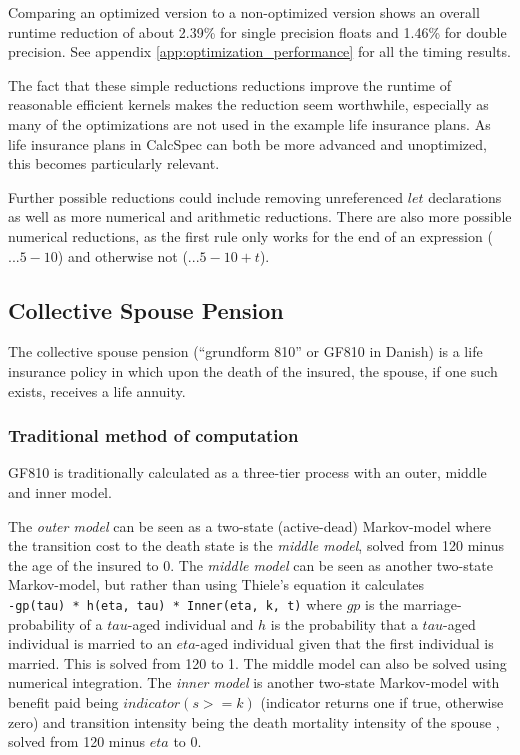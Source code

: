 Comparing an optimized version to a non-optimized version shows an overall runtime reduction of about 2.39\% for single precision floats and 1.46\% for double precision.
See appendix \ref{app:optimization_performance} for all the timing results.

The fact that these simple reductions reductions improve the runtime of reasonable efficient kernels makes the reduction seem worthwhile, especially as many of the optimizations are not used in the example life insurance plans.
As life insurance plans in CalcSpec can both be more advanced and unoptimized, this becomes particularly relevant.

Further possible reductions could include removing unreferenced $let$ declarations as well as more numerical and arithmetic reductions.
There are also more possible numerical reductions, as the first rule only works for the end of an expression ($... 5 - 10$) and otherwise not ($... 5 - 10 + t$).

\subsection{Collective Spouse Pension}\label{sub:gf810}
The collective spouse pension (``grundform 810'' or GF810 in Danish) is a life insurance policy in which upon the death of the insured, the spouse, if one such exists, receives a life annuity.

\subsubsection{Traditional method of computation}
GF810 is traditionally calculated as a three-tier process with an outer, middle and inner model.

The \emph{outer model} can be seen as a two-state (active-dead) Markov-model where the transition cost to the death state is the \emph{middle model}, solved from 120 minus the age of the insured to 0.
The \emph{middle model} can be seen as another two-state Markov-model, but rather than using Thiele's equation it calculates \\\lstinline$-gp(tau) * h(eta, tau) * Inner(eta, k, t)$ where $gp$ is the marriage-probability of a $tau$-aged individual and $h$ is the probability that a $tau$-aged individual is married to an $eta$-aged individual given that the first individual is married.
This is solved from 120 to 1. The middle model can also be solved using numerical integration.
The \emph{inner model} is another two-state Markov-model with benefit paid being $indicator(s >= k)$ (indicator returns one if true, otherwise zero) and transition intensity being the death mortality intensity of the spouse , solved from 120 minus $eta$ to 0.

